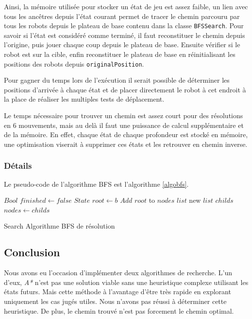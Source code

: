 \documentclass[a4paper]{article} %
\begin{document}
Ainsi, la mémoire utilisée pour stocker un état de jeu est assez faible, un lien avec tous les ancêtres depuis l'état courant permet de tracer le chemin parcouru par tous les robots depuis le plateau de base contenu dans la classe \texttt{BFSSearch}. Pour savoir si l'état est considéré comme terminé, il faut reconstituer le chemin depuis l'origine, puis jouer chaque coup depuis le plateau de base. Ensuite vérifier si le robot est sur la cible, enfin reconstituer le plateau de base en réinitialisant les positions des robots depuis \texttt{originalPosition}.

Pour gagner du temps lors de l’exécution il serait possible de déterminer les positions d'arrivée à chaque état et de placer directement le robot à cet endroit à la place de réaliser les multiples tests de déplacement.

Le temps nécessaire pour trouver un chemin est assez court pour des résolutions en 6 mouvements, mais au delà il faut une puissance de calcul supplémentaire et de la mémoire. En effet, chaque état de chaque profondeur est stocké en mémoire, une optimisation viserait à supprimer ces états et les retrouver en chemin inverse.

		\subsubsection{Détails}
Le pseudo-code de l'algorithme BFS est l'algorithme \ref{algobfs}.

\begin{algorithm}
\DontPrintSemicolon
\SetAlgoVlined
{}
$Bool$  $finished \gets false$\;
$State$  $root \gets b$\;
$Add$ $root$ to $nodes$ $list$\; 
 {
	new $list$ $childs$\;
	$nodes \gets childs$\;
}
\;
\caption{{\sc Search} Algorithme BFS de résolution}
\label{algobfs}
\end{algorithm}

	\subsection{Conclusion}
Nous avons eu l'occasion d'implémenter deux algorithmes de recherche. L'un d'eux, \textsl{A*} n'est pas une solution viable sans une heuristique complexe utilisant les états futurs. Mais cette méthode à l'avantage d'être très rapide en explorant uniquement les cas jugés utiles. Nous n'avons pas réussi à déterminer cette heuristique. De plus, le chemin trouvé n'est pas forcement le chemin optimal.
\end{document}

